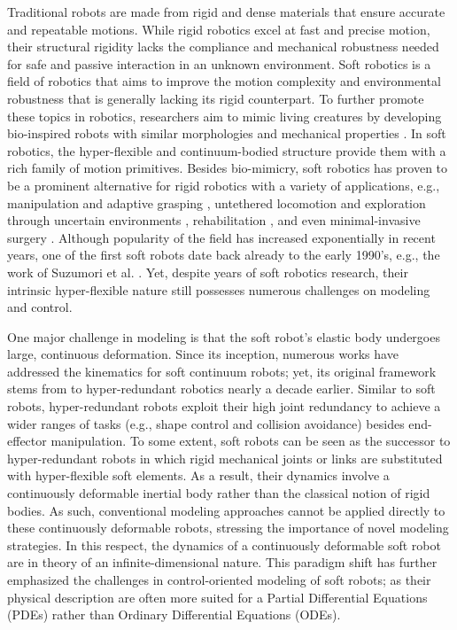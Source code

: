 Traditional robots are made from rigid and dense materials that ensure accurate and repeatable motions. While rigid robotics excel at fast and precise motion, their structural rigidity lacks the compliance and mechanical robustness needed for safe and passive interaction in an unknown environment. Soft robotics is a field of robotics that aims to improve the motion complexity and environmental robustness that is generally lacking its rigid counterpart. To further promote these topics in robotics, researchers aim to mimic living creatures by developing bio-inspired robots with similar morphologies and mechanical properties \cite{Falkenhahn2015,Suzumori1991,Godage2015,Godage2016,Marchese2014,Kriegman2019}.
In soft robotics, the hyper-flexible and continuum-bodied structure provide them with a rich family of motion primitives. Besides bio-mimicry, soft robotics has proven to be a prominent alternative for rigid robotics with a variety of applications, e.g., manipulation and adaptive grasping \cite{Galloway2016}, untethered locomotion and exploration through uncertain environments \cite{Marchese2014,Choi2011,Pilz2020}, rehabilitation \cite{Polygerinos2015}, and even minimal-invasive surgery \cite{Li2017a,Cianchetti2014}. Although popularity of the field has increased exponentially in recent years, one of the first soft robots date back already to the early 1990's, e.g., the work of Suzumori et al. \cite{Suzumori1991}. Yet, despite years of soft robotics research, their intrinsic hyper-flexible nature still possesses numerous challenges on modeling and control.

One major challenge in modeling is that the soft robot's elastic body undergoes large, continuous deformation. Since its inception, numerous works have addressed the kinematics for soft continuum robots\cite{Jones2006,Mochiyama2003}; yet, its original framework stems from to hyper-redundant robotics nearly a decade earlier\cite{Chirikjian1992,Chirikjian1994}. Similar to soft robots, hyper-redundant robots exploit their high joint redundancy to achieve a wider ranges of tasks (e.g., shape control and collision avoidance) besides end-effector manipulation. To some extent, soft robots can be seen as the successor to hyper-redundant robots in which rigid mechanical joints or links are substituted with hyper-flexible soft elements. As a result, their dynamics involve a continuously deformable inertial body rather than the classical notion of rigid bodies. As such, conventional modeling approaches cannot be applied directly to these continuously deformable robots, stressing the importance of novel modeling strategies. In this respect, the dynamics of a continuously deformable soft robot are in theory of an infinite-dimensional nature. This paradigm shift has further emphasized the challenges in control-oriented modeling of soft robots; as their physical description are often more suited for a Partial Differential Equations (PDEs) rather than Ordinary Differential Equations (ODEs).

